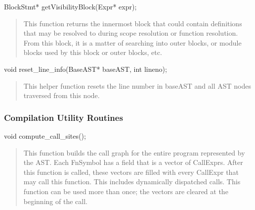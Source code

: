 \documentclass[10pt]{article}
\begin{document}
\begin{clang}
BlockStmt* getVisibilityBlock(Expr* expr);
\end{clang}
\begin{quote}
This function returns the innermost block that could contain
definitions that may be resolved to during scope resolution or
function resolution.  From this block, it is a matter of searching
into outer blocks, or module blocks used by this block or outer
blocks, etc.
\end{quote}

\begin{clang}
void reset_line_info(BaseAST* baseAST, int lineno);
\end{clang}
\begin{quote}
This helper function resets the line number in baseAST and all AST
nodes traversed from this node.
\end{quote}

\subsubsection{Compilation Utility Routines}
\label{sec:util}

\begin{clang}
void compute_call_sites();
\end{clang}
\begin{quote}
This function builds the call graph for the entire program represented
by the AST.  Each FnSymbol has a field  that is a vector
of CallExprs.  After this function is called, these vectors are filled
with every CallExpr that may call this function.  This includes
dynamically dispatched calls.  This function can be used more than
once; the vectors are cleared at the beginning of the call.
\end{quote}
\end{document}
